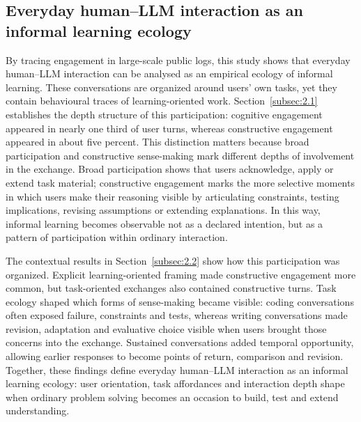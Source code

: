 \subsection*{Everyday human--LLM interaction as an informal learning ecology}

By tracing engagement in large-scale public logs, this study shows that everyday human--LLM interaction can be analysed as an empirical ecology of informal learning. These conversations are organized around users' own tasks, yet they contain behavioural traces of learning-oriented work. Section~\ref{subsec:2.1} establishes the depth structure of this participation: cognitive engagement appeared in nearly one third of user turns, whereas constructive engagement appeared in about five percent. This distinction matters because broad participation and constructive sense-making mark different depths of involvement in the exchange. Broad participation shows that users acknowledge, apply or extend task material; constructive engagement marks the more selective moments in which users make their reasoning visible by articulating constraints, testing implications, revising assumptions or extending explanations. 
In this way, informal learning becomes observable not as a declared intention, but as a pattern of participation within ordinary interaction.

The contextual results in Section~\ref{subsec:2.2} show how this participation was organized. Explicit learning-oriented framing made constructive engagement more common, but task-oriented exchanges also contained constructive turns. Task ecology shaped which forms of sense-making became visible: coding conversations often exposed failure, constraints and tests, whereas writing conversations made revision, adaptation and evaluative choice visible when users brought those concerns into the exchange. Sustained conversations added temporal opportunity, allowing earlier responses to become points of return, comparison and revision. 
Together, these findings define everyday human--LLM interaction as an informal learning ecology: user orientation, task affordances and interaction depth shape when ordinary problem solving becomes an occasion to build, test and extend understanding.

